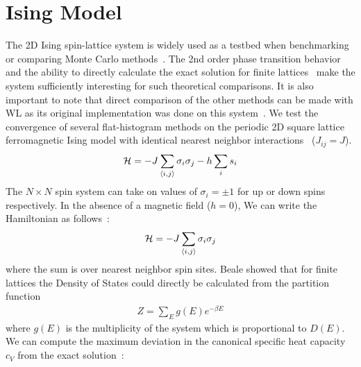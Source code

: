 \section{Ising Model}
The 2D Ising spin-lattice system is widely used as a testbed when
benchmarking or comparing Monte Carlo
methods~\cite{ferdinand1969bounded, wang1999transition, trebst2004optimizing, barash2019estimating}. The 2nd order
phase transition behavior and the ability to directly calculate the
exact solution for finite lattices~\cite{beale1996exact, haggkvist2004computation} make the
system sufficiently interesting for such theoretical comparisons. It is
also important to note that direct comparison of the other methods can
be made with WL as its original implementation was done on this
system~\cite{wang2001determining,wang2001efficient}.
We test the convergence of several flat-histogram methods
on the periodic 2D square lattice ferromagnetic Ising model with identical
nearest neighbor interactions~\cite{landau2004new} ($J_{ij} = J$).
\begin{align}
\mathcal{H} = -J \sum_{\braket{i,j}} \sigma_i \sigma_j - h \sum_i s_i
\end{align}
The $N\times N$ spin system can take on values of $\sigma_i = \pm 1$
for up or down spins respectively. In the absence of a magnetic field ($h =
0$), We can write the Hamiltonian as follows~\cite{onsager1944crystal,
kaufman1949crystal}:
\begin{align}
\mathcal{H} = - J\sum_{\braket{i,j}} \sigma_i \sigma_j
\end{align}
where the sum is over nearest neighbor spin sites. Beale showed that for finite
lattices the Density of States could directly be calculated from the partition
function~\cite{beale1996exact}
\begin{align}
Z = \sum_E g(E) e^{-{\beta E}}
\end{align}
where $g(E)$ is the multiplicity of the system which is proportional to
$D(E)$. We can compute the maximum deviation in the canonical specific heat capacity $c_V$ from the exact solution~\cite{schneider2017convergence, shakirov2018convergence,
barash2017control,barash2017gpu}:
